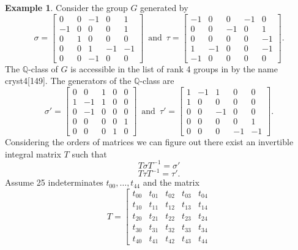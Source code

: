 \documentclass{article}
\theoremstyle{plain}
\theoremstyle{definition}
\newtheorem{example}[theorem]{Example}
\newcommand{\Q}{\ensuremath{\mathbb{Q}}}
\newcommand{\tand}{\ensuremath{\,\,\, \text{and} \,\,\,}}
\begin{document}
\begin{example}\label{exmp:Decompose}
Consider the group $G$ generated by 
$$
\sigma = \left[\begin{array}{rrrrr}
0 & 0 & -1 & 0 & 1 \\
-1 & 0 & 0 & 0 & 1 \\
0 & 1 & 0 & 0 & 0 \\
0 & 0 & 1 & -1 & -1 \\
0 & 0 & -1 & 0 & 0
\end{array}\right]
 \tand
\tau = \left[\begin{array}{rrrrr}
-1 & 0 & 0 & -1 & 0 \\
0 & 0 & -1 & 0 & 1 \\
0 & 0 & 0 & 0 & -1 \\
1 & -1 & 0 & 0 & -1 \\
-1 & 0 & 0 & 0 & 0
\end{array}\right].
$$
The $\Q$-class of $G$ is accessible in the list of rank 4 groups in \cite{Hoshi} by the name cryst4[149]. The generators of the $\Q$-class are
$$
\sigma' =\left[\begin{array}{rrr|rr}
0 & 0 & 1 & 0 & 0 \\
1 & -1 & 1 & 0 & 0 \\
0 & -1 & 0 & 0 & 0 \\
\hline
0 & 0 & 0 & 0 & 1 \\
0 & 0 & 0 & 1 & 0
\end{array}\right]
 \tand
\tau' = \left[\begin{array}{rrr|rr}
1 & -1 & 1 & 0 & 0 \\
1 & 0 & 0 & 0 & 0 \\
0 & 0 & -1 & 0 & 0 \\
\hline
0 & 0 & 0 & 0 & 1 \\
0 & 0 & 0 & -1 & -1
\end{array}\right].
$$
Considering the orders of matrices we can figure out there exist an invertible integral matrix $T$ such that 
$$T\sigma T^{-1}= \sigma'$$
$$T\tau T^{-1} = \tau'.$$
Assume 25 indeterminates $t_{00}  ,\ldots , t_{44}$ and the matrix
$$
T =\left[\begin{array}{rrrrr}
t_{00} & t_{01} & t_{02} & t_{03} & t_{04} \\
t_{10} & t_{11} & t_{12} & t_{13} & t_{14} \\
t_{20} & t_{21} & t_{22} & t_{23} & t_{24} \\
t_{30} & t_{31} & t_{32} & t_{33} & t_{34} \\
t_{40} & t_{41} & t_{42} & t_{43} & t_{44}

\end{array}$$
\end{example}
\end{document}
